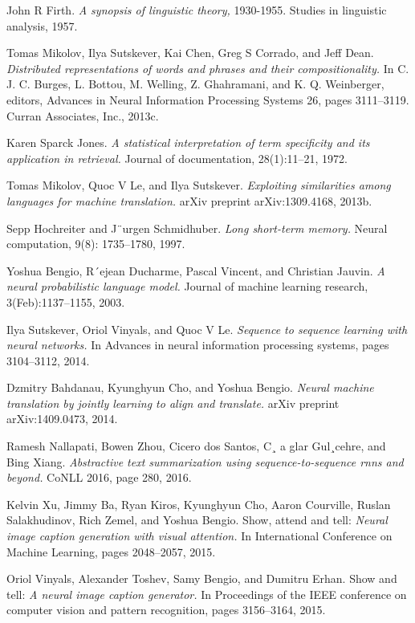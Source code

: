 \documentclass[11pt]{article}
\begin{document}
\pagebreak
\medskip
\begin{thebibliography}{9}
{} 

John R Firth.
\textit{A synopsis of linguistic theory,}  1930-1955. Studies in linguistic analysis, 1957.

Tomas Mikolov, Ilya Sutskever, Kai Chen, Greg S Corrado, and Jeff Dean. \textit{ Distributed representations of words and phrases and their compositionality.} 
In C. J. C. Burges, L. Bottou, M. Welling, Z. Ghahramani, and K. Q. Weinberger, editors, Advances in Neural Information
Processing Systems 26, pages 3111–3119. Curran Associates, Inc., 2013c.

Karen Sparck Jones. \textit{A statistical interpretation of term specificity and its application in retrieval.}
Journal of documentation, 28(1):11–21, 1972.

Tomas Mikolov, Quoc V Le, and Ilya Sutskever. \textit{Exploiting similarities among languages for machine
translation.} arXiv preprint arXiv:1309.4168, 2013b.

Sepp Hochreiter and J¨urgen Schmidhuber. \textit{Long short-term memory.} Neural computation, 9(8):
1735–1780, 1997.

Yoshua Bengio, R´ejean Ducharme, Pascal Vincent, and Christian Jauvin. \textit{A neural probabilistic
language model.} Journal of machine learning research, 3(Feb):1137–1155, 2003.

Ilya Sutskever, Oriol Vinyals, and Quoc V Le. \textit{Sequence to sequence learning with neural networks.}
In Advances in neural information processing systems, pages 3104–3112, 2014.

Dzmitry Bahdanau, Kyunghyun Cho, and Yoshua Bengio. \textit{Neural machine translation by jointly
learning to align and translate.} arXiv preprint arXiv:1409.0473, 2014.


Ramesh Nallapati, Bowen Zhou, Cicero dos Santos, C¸ a glar Gul¸cehre, and Bing Xiang. \textit{ Abstractive
text summarization using sequence-to-sequence rnns and beyond.} CoNLL 2016, page 280, 2016.

Kelvin Xu, Jimmy Ba, Ryan Kiros, Kyunghyun Cho, Aaron Courville, Ruslan Salakhudinov, Rich
Zemel, and Yoshua Bengio. Show, attend and tell: \textit{Neural image caption generation with visual
attention.} In International Conference on Machine Learning, pages 2048–2057, 2015.


Oriol Vinyals, Alexander Toshev, Samy Bengio, and Dumitru Erhan. Show and tell: \textit{A neural
image caption generator.} In Proceedings of the IEEE conference on computer vision and pattern
recognition, pages 3156–3164, 2015.




\end{thebibliography}
\end{document}
